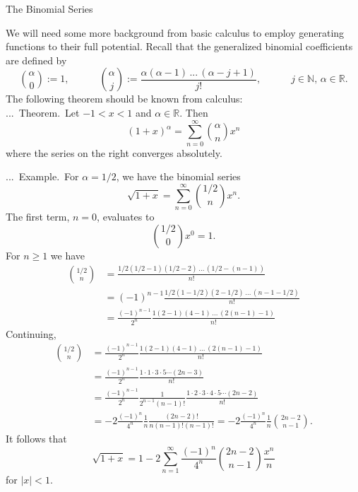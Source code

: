\documentclass[smaller,hyperref={CJKbookmarks=true}]{beamer}
\newcommand{\N}{\mathbb{N}} \newcommand{\Z}{\mathbb{Z}} \newcommand{\Q}{\mathbb{Q}}
\newcommand{\R}{\mathbb{R}}
\newcounter{zhuo}[subsection]
\renewcommand{\thezhuo}{\thesection.\thesubsection.\arabic{zhuo}}
\newenvironment{EXAMPLE}{\stepcounter{zhuo}\alert{\!\thezhuo.~Example.\,}}{}
\newenvironment{THEOREM}{\stepcounter{zhuo}\alert{\thezhuo.~Theorem.\,}}{}
\begin{document}
\begin{frame}{The Binomial Series}
\begin{spacing}{1.05}
We will need some more background from basic calculus to employ
generating functions to their full potential. Recall that the generalized
binomial coefficients are defined by
\[\binom{\alpha}{0}:=1,\qquad\quad\binom{\alpha}{j}:=
\frac{\alpha(\alpha-1)\,...\,(\alpha-j+1)}{j!},\qquad\quad
j\in\N,\,\alpha\in\R.\]
The following theorem should be known from calculus:\\[6pt]
\begin{THEOREM}
Let $-1<x<1$ and $\alpha\in\R$. Then
\[(1+x)^\alpha=\sum_{n=0}^{\infty}\binom{\alpha}{n}x^n\]
where the series on the right converges absolutely.
\end{THEOREM}
\end{spacing}
\newpage
\begin{spacing}{0.75}
\begin{EXAMPLE}
For $\alpha=1/2$, we have the binomial series
\[\sqrt{1+x}=\sum_{n=0}^{\infty}\binom{1/2}{n}x^n.\]
The first term, $n=0$, evaluates to
\[\binom{1/2}{0}x^0=1.\]
For $n\geq1$ we have
\begin{equation*}
  \begin{split}
     \binom{1/2}{n} &=\frac{1/2(1/2-1)(1/2-2)\,...\,(1/2-(n-1))}{n!} \\
       &=(-1)^{n-1}\frac{1/2(1-1/2)(2-1/2)\,...\,(n-1-1/2)}{n!} \\
       &=\frac{(-1)^{n-1}}{2^n}\frac{1(2-1)(4-1)\,...\,(2(n-1)-1)}{n!}
  \end{split}
\end{equation*}
\end{EXAMPLE}
\!\!Continuing,
\begin{equation*}
  \begin{split}
     \binom{1/2}{n} &=\frac{(-1)^{n-1}}{2^n}\frac{1(2-1)(4-1)\,...\,(2(n-1)-1)}{n!} \\
       &=\frac{(-1)^{n-1}}{2^n}\frac{1\cdot1\cdot3\cdot5\cdots(2n-3)}{n!} \\
       &=\frac{(-1)^{n-1}}{2^n}\frac{1}{2^{n-1}(n-1)!}\frac{1\cdot2\cdot3\cdot4\cdot5\cdots(2n-2)}{n!} \\
       &=-2\frac{(-1)^n}{4^n}\frac{1}{n}\frac{(2n-2)!}{n(n-1)!(n-1)!}=-2\frac{(-1)^n}{4^n}\frac{1}{n}
       \binom{2n-2}{n-1}.
  \end{split}
\end{equation*}
It follows that
\begin{equation}\label{3.6.4}
\sqrt{1+x}=1-2\sum_{n=1}^{\infty}\frac{(-1)^n}{4^n}
\binom{2n-2}{n-1}\frac{x^n}{n}
\end{equation}
for $|x|<1$.
\end{spacing}
\end{frame}
\end{document}
